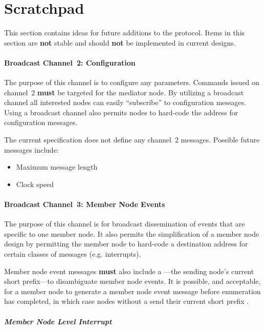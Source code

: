 \section{Scratchpad}
This section contains ideas for future additions to the \bus protocol. Items
in this section are {\bf not} stable and should {\bf not} be implemented in
current \bus designs.

\paragraph{Broadcast Channel~2: \bus Configuration}
\label{scratch:sec:channel-2}

The purpose of this channel is to configure any \bus parameters. Commands
issued on channel~2 {\bf must} be targeted for the mediator node. By utilizing
a broadcast channel all interested nodes can easily ``subscribe'' to
configuration messages. Using a broadcast channel also permits nodes to
hard-code the address for configuration messages.

The current \bus specification does not define any channel~2 messages.
Possible future messages include:
\begin{itemize}
  \item Maximum message length
  \item Clock speed
\end{itemize}

\paragraph{Broadcast Channel~3: Member Node Events}
\label{scratch:sec:channel-3}

The purpose of this channel is for broadcast dissemination of events that are
specific to one member node.  It also permits the simplification of a member
node design by permitting the member node to hard-code a destination address
for certain classes of messages (e.g. interrupts).

Member node event messages {\bf must} also include a ---the sending node's current short prefix---to disambiguate
member node events. It is possible, and acceptable, for a member node to
generate a member node event message before enumeration has completed, in
which case nodes without a  send
their current short prefix .


\subparagraph{Member Node Level Interrupt}
\label{scratch:cmd:level-interrupt}
~

